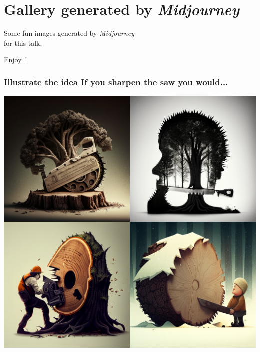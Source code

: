 \documentclass[9pt,table,xcolor=dvipsnames]{beamer}%
\theoremstyle{definition}
\theoremstyle{plain}
\begin{document}
\section{Gallery generated by \textit{Midjourney}}
\begin{frame}[fragile] %
  \begin{center}
    \Large
    Some fun images generated by \textit{Midjourney}\\ \bigskip
    for this talk. \bigskip

    Enjoy~!
  \end{center}
\end{frame}
\begin{frame}[fragile,t] %
  \frametitle{Illustrate the idea If you sharpen the saw you would...}
  \begin{center}
    \includegraphics[scale=0.22]{./figs/chenle02_Illustrate_the_idea_If_you_sharpen_the_saw_you_would.png}
  \end{center}
\end{frame}
\end{document}
